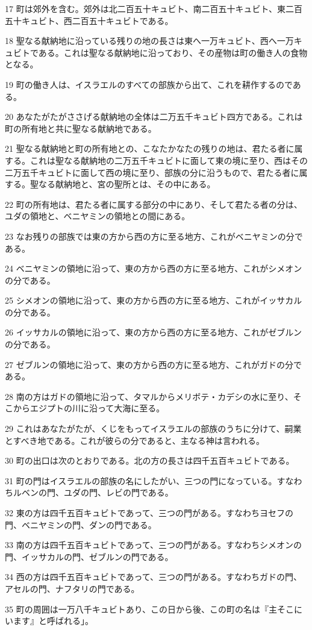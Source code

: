 \par 17 町は郊外を含む。郊外は北二百五十キュビト、南二百五十キュビト、東二百五十キュビト、西二百五十キュビトである。
\par 18 聖なる献納地に沿っている残りの地の長さは東へ一万キュビト、西へ一万キュビトである。これは聖なる献納地に沿っており、その産物は町の働き人の食物となる。
\par 19 町の働き人は、イスラエルのすべての部族から出て、これを耕作するのである。
\par 20 あなたがたがささげる献納地の全体は二万五千キュビト四方である。これは町の所有地と共に聖なる献納地である。
\par 21 聖なる献納地と町の所有地との、こなたかなたの残りの地は、君たる者に属する。これは聖なる献納地の二万五千キュビトに面して東の境に至り、西はその二万五千キュビトに面して西の境に至り、部族の分に沿うもので、君たる者に属する。聖なる献納地と、宮の聖所とは、その中にある。
\par 22 町の所有地は、君たる者に属する部分の中にあり、そして君たる者の分は、ユダの領地と、ベニヤミンの領地との間にある。
\par 23 なお残りの部族では東の方から西の方に至る地方、これがベニヤミンの分である。
\par 24 ベニヤミンの領地に沿って、東の方から西の方に至る地方、これがシメオンの分である。
\par 25 シメオンの領地に沿って、東の方から西の方に至る地方、これがイッサカルの分である。
\par 26 イッサカルの領地に沿って、東の方から西の方に至る地方、これがゼブルンの分である。
\par 27 ゼブルンの領地に沿って、東の方から西の方に至る地方、これがガドの分である。
\par 28 南の方はガドの領地に沿って、タマルからメリボテ・カデシの水に至り、そこからエジプトの川に沿って大海に至る。
\par 29 これはあなたがたが、くじをもってイスラエルの部族のうちに分けて、嗣業とすべき地である。これが彼らの分であると、主なる神は言われる。
\par 30 町の出口は次のとおりである。北の方の長さは四千五百キュビトである。
\par 31 町の門はイスラエルの部族の名にしたがい、三つの門になっている。すなわちルベンの門、ユダの門、レビの門である。
\par 32 東の方は四千五百キュビトであって、三つの門がある。すなわちヨセフの門、ベニヤミンの門、ダンの門である。
\par 33 南の方は四千五百キュビトであって、三つの門がある。すなわちシメオンの門、イッサカルの門、ゼブルンの門である。
\par 34 西の方は四千五百キュビトであって、三つの門がある。すなわちガドの門、アセルの門、ナフタリの門である。
\par 35 町の周囲は一万八千キュビトあり、この日から後、この町の名は『主そこにいます』と呼ばれる」。


